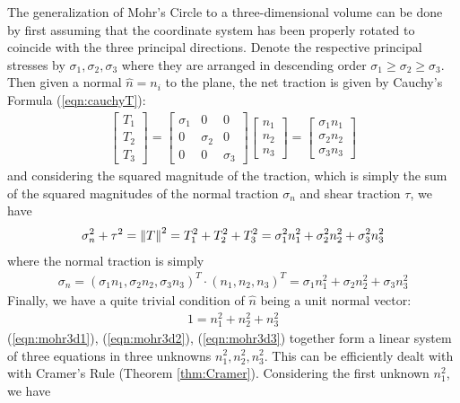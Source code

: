 The generalization of Mohr's Circle to a three-dimensional volume can be done by first assuming that the coordinate system has been properly rotated to coincide with the three principal directions. Denote the respective principal stresses by $\sigma_1, \sigma_2, \sigma_3$ where they are arranged in descending order $\sigma_1 \geq \sigma_2 \geq \sigma_3$. Then given a normal $\hat{n} = n_i$ to the plane, the net traction is given by Cauchy's Formula (\ref{eqn:cauchyT}):
\begin{align}
\begin{bmatrix}
T_1 \\
T_2 \\
T_3
\end{bmatrix}  
=
\begin{bmatrix}
\sigma_{1} & 0 & 0 \\
0 & \sigma_{2} & 0 \\
0 & 0 & \sigma_{3}
\end{bmatrix}
\begin{bmatrix}
n_1 \\
n_2 \\
n_3
\end{bmatrix}
=
\begin{bmatrix}
\sigma_1 n_1 \\
\sigma_2 n_2 \\
\sigma_3 n_3
\end{bmatrix}    
\end{align}
and considering the squared magnitude of the traction, which is simply the sum of the squared magnitudes of the normal traction $\sigma_n$ and shear traction $\tau$, we have
\begin{align}
\sigma_n^2 + \tau^2 = \norm{T}^2 = T_1^2 + T_2^2 + T_3^2 = \sigma_1^2 n_1^2 + \sigma_2^2 n_2^2 + \sigma_3^2 n_3^2 \label{eqn:mohr3d1}
\end{align}
where the normal traction is simply
\begin{align}
\sigma_n = (\sigma_1 n_1, \sigma_2 n_2, \sigma_3 n_3)^T \cdot (n_1, n_2, n_3)^T = \sigma_1n_1^2 + \sigma_2n_2^2 + \sigma_3n_3^2 \label{eqn:mohr3d2}
\end{align}
Finally, we have a quite trivial condition of $\hat{n}$ being a unit normal vector:
\begin{align}
1 = n_1^2 + n_2^2 + n_3^2 \label{eqn:mohr3d3}
\end{align}
(\ref{eqn:mohr3d1}), (\ref{eqn:mohr3d2}), (\ref{eqn:mohr3d3}) together form a linear system of three equations in three unknowns $n_1^2, n_2^2, n_3^2$. This can be efficiently dealt with with Cramer's Rule (Theorem \ref{thm:Cramer}). Considering the first unknown $n_1^2$, we have
